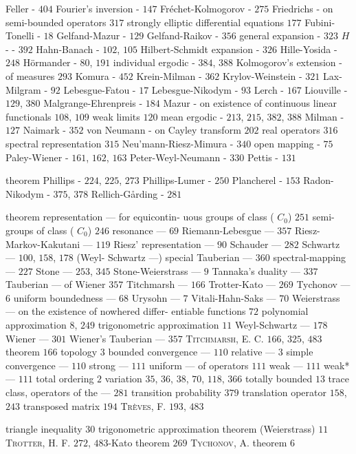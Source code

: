 Feller - $404$ Fourier's inversion - $147$ Fréchet-Kolmogorov - $275$ Friedrichs - on semi-bounded operators $317$ strongly elliptic differential equations $177$ Fubini-Tonelli - $18$ Gelfand-Mazur - $129$ Gelfand-Raikov - $356$ general expansion - $323$ $H$- - $392$ Hahn-Banach - $102$, $105$ Hilbert-Schmidt expansion - $326$ Hille-Yosida - $248$ Hörmander - $80$, $191$ individual ergodic - $384$, $388$ Kolmogorov's extension - of measures $293$ Komura - $452$ Krein-Milman - $362$ Krylov-Weinstein - $321$ Lax-Milgram - $92$ Lebesgue-Fatou - $17$ Lebesgue-Nikodym - $93$ Lerch - $167$ Liouville - $129$, $380$ Malgrange-Ehrenpreis - $184$ Mazur - on existence of continuous linear functionals $108$, $109$ weak limits $120$ mean ergodic - $213$, $215$, $382$, $388$ Milman - $127$ Naimark - $352$ von Neumann - on Cayley transform $202$ real operators $316$ spectral representation $315$ Neu'mann-Riesz-Mimura - $340$ open mapping - $75$ Paley-Wiener - $161$, $162$, $163$ Peter-Weyl-Neumann - $330$ Pettis - $131$

theorem Phillips - $224$, $225$, $273$ Phillips-Lumer - $250$ Plancherel - $153$ Radon-Nikodym - $375$, $378$ Rellich-Gårding - $281$ 

theorem representation --- for equicontin- uous groups of class ( $C_0$) $251$ semi-groups of class ( $C_0$) $246$ resonance --- $69$ Riemann-Lebesgue --- $357$ Riesz-Markov-Kakutani --- $119$ Riesz' representation --- $90$ Schauder --- $282$ Schwartz --- $100$, $158$, $178$ (Weyl- Schwartz ---) special Tauberian --- $360$ spectral-mapping --- $227$ Stone --- $253$, $345$ Stone-Weierstrass --- $9$ Tannaka's duality --- $337$ Tauberian --- of Wiener $357$ Titchmarsh --- $166$ Trotter-Kato --- $269$ Tychonov --- $6$ uniform boundedness --- $68$ Urysohn --- $7$ Vitali-Hahn-Saks --- $70$ Weierstrass --- on the existence of nowhered differ- entiable functions $72$ polynomial approximation $8$, $249$ trigonometric approximation $11$ Weyl-Schwartz --- $178$ Wiener --- $301$ Wiener's Tauberian --- $357$ \textsc{Titchmarsh}, E. C. $166$, $325$, $483$ theorem $166$ topology $3$ bounded convergence --- $110$ relative --- $3$ simple convergence --- $110$ strong --- $111$ uniform --- of operators $111$ weak --- $111$ weak* --- $111$ total ordering $2$ variation $35$, $36$, $38$, $70$, $118$, $366$ totally bounded $13$ trace class, operators of the --- $281$ transition probability $379$ translation operator $158$, $243$ transposed matrix $194$ \textsc{Trèves}, F. $193$, $483$ 

triangle inequality $30$ trigonometric approximation theorem (Weierstrass) $11$ \textsc{Trotter}, H. F. $272$, $483$-Kato theorem $269$ \textsc{Tychonov}, A. theorem $6$


